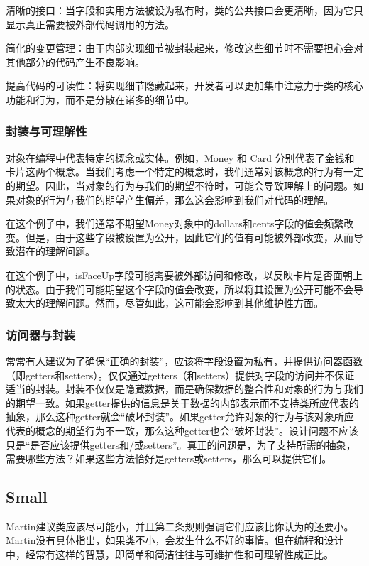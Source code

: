 清晰的接口：当字段和实用方法被设为私有时，类的公共接口会更清晰，因为它只显示真正需要被外部代码调用的方法。

简化的变更管理：由于内部实现细节被封装起来，修改这些细节时不需要担心会对其他部分的代码产生不良影响。

提高代码的可读性：将实现细节隐藏起来，开发者可以更加集中注意力于类的核心功能和行为，而不是分散在诸多的细节中。

\subsubsection{封装与可理解性}

对象在编程中代表特定的概念或实体。例如，Money 和 Card 分别代表了金钱和卡片这两个概念。当我们考虑一个特定的概念时，我们通常对该概念的行为有一定的期望。因此，当对象的行为与我们的期望不符时，可能会导致理解上的问题。如果对象的行为与我们的期望产生偏差，那么这会影响到我们对代码的理解。

在这个例子中，我们通常不期望Money对象中的dollars和cents字段的值会频繁改变。但是，由于这些字段被设置为公开，因此它们的值有可能被外部改变，从而导致潜在的理解问题。

在这个例子中，isFaceUp字段可能需要被外部访问和修改，以反映卡片是否面朝上的状态。由于我们可能期望这个字段的值会改变，所以将其设置为公开可能不会导致太大的理解问题。然而，尽管如此，这可能会影响到其他维护性方面。

\subsubsection{访问器与封装}

常常有人建议为了确保“正确的封装”，应该将字段设置为私有，并提供访问器函数（即getters和setters）。仅仅通过getters（和setters）提供对字段的访问并不保证适当的封装。封装不仅仅是隐藏数据，而是确保数据的整合性和对象的行为与我们的期望一致。如果getter提供的信息是关于数据的内部表示而不支持类所应代表的抽象，那么这种getter就会“破坏封装”。如果getter允许对象的行为与该对象所应代表的概念的期望行为不一致，那么这种getter也会“破坏封装”。设计问题不应该只是“是否应该提供getters和/或setters”。真正的问题是，为了支持所需的抽象，需要哪些方法？如果这些方法恰好是getters或setters，那么可以提供它们。

\subsection{Small}
Martin建议类应该尽可能小，并且第二条规则强调它们应该比你认为的还要小。Martin没有具体指出，如果类不小，会发生什么不好的事情。但在编程和设计中，经常有这样的智慧，即简单和简洁往往与可维护性和可理解性成正比。

